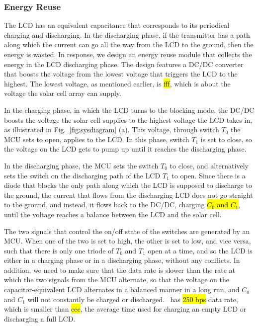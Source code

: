 \subsubsection{Energy Reuse}
The LCD has an equivalent capacitance that corresponds to its periodical charging and discharging. In the discharging phase, if the transmitter has a path along which the current can go all the way from the LCD to the ground, then the energy is wasted. In response, we design an energy reuse module that collects the energy in the LCD discharging phase. The design features a DC/DC converter that boosts the voltage from the lowest voltage that triggers the LCD to the highest. The lowest voltage, as mentioned earlier, is \hl{fff}, which is about the voltage the solar cell array can supply. 

In the charging phase, in which the LCD turns to the blocking mode, the DC/DC boosts the voltage the solar cell supplies to the highest voltage the LCD takes in, as illustrated in Fig.~\ref{fig:sysdiagram} (a). This voltage, through switch $T_0$ the MCU sets to open, applies to the LCD. In this phase, switch $T_1$ is set to close, so the voltage on the LCD gets to pump up until it reaches the discharging phase.

In the discharging phase, the MCU sets the switch $T_0$ to close, and alternatively sets the switch on the discharging path of the LCD $T_1$ to open. Since there is a diode that blocks the only path along which the LCD is supposed to discharge to the ground, the current that flows from the discharging LCD does not go straight to the ground, and instead, it flows back to the DC/DC, charging \hl{$C_0$ and $C_1$}, until the voltage reaches a balance between the LCD and the solar cell. 

The two signals that control the on/off state of the switches are generated by an MCU. When one of the two is set to high, the other is set to low, and vice versa, such that there is only one triode of $T_0$ and $T_1$ open at a time, and so the LCD is either in a charging phase or in a discharging phase, without any conflicts. In addition, we need to make sure that the data rate is slower than the rate at which the two signals from the MCU alternate, so that the voltage on the capacitor-equivalent LCD alternates in a balanced manner in a long run, and $C_0$ and $C_1$ will not constantly be charged or discharged. \vitag\ has \hl{250 bps} data rate, which is smaller than \hl{ccc}, the average time used for charging an empty LCD or discharging a full LCD.






